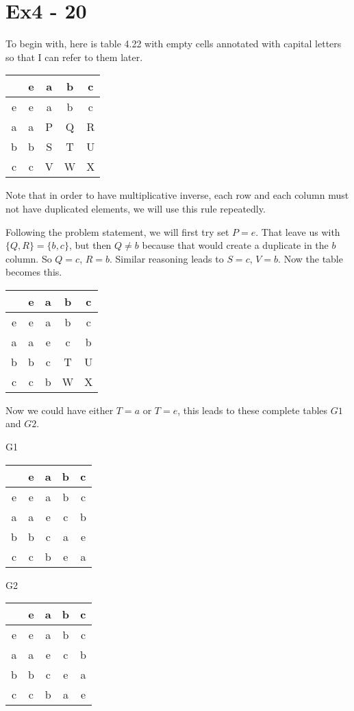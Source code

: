 \section*{Ex4 - 20}
To begin with, here is table 4.22 with empty cells annotated with capital letters so that I can refer to them later.

\begin{tabular}{ c|c|c|c|c }
      & e & a & b & c \\
    \hline
    e & e & a & b & c \\
    a & a & P & Q & R \\
    b & b & S & T & U \\
    c & c & V & W & X 
\end{tabular}

Note that in order to have multiplicative inverse, each row and each column must not have duplicated elements, we will use this rule repeatedly.

Following the problem statement, we will first try set $ P = e $. That leave us with $ \{Q, R\} = \{b, c\} $, but then $ Q \ne b $ because that would create a duplicate in the $ b $ column. So $ Q = c $, $ R = b $. Similar reasoning leads to $ S = c $, $ V = b $. Now the table becomes this.

\begin{tabular}{ c|c|c|c|c }
    & e & a & b & c \\
  \hline
  e & e & a & b & c \\
  a & a & e & c & b \\
  b & b & c & T & U \\
  c & c & b & W & X 
\end{tabular}

Now we could have either $ T = a $ or $ T = e $, this leads to these complete tables $ G1 $ and $ G2 $.

G1

\begin{tabular}{ c|c|c|c|c }
    & e & a & b & c \\
  \hline
  e & e & a & b & c \\
  a & a & e & c & b \\
  b & b & c & a & e \\
  c & c & b & e & a 
\end{tabular}

G2

\begin{tabular}{ c|c|c|c|c }
    & e & a & b & c \\
  \hline
  e & e & a & b & c \\
  a & a & e & c & b \\
  b & b & c & e & a \\
  c & c & b & a & e 
\end{tabular}

